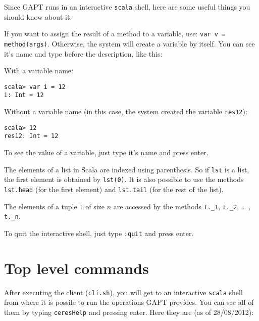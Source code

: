 \documentclass[a4paper, 11pt]{report}
\begin{document}
Since GAPT runs in an interactive \texttt{scala} shell, here are some useful things you
should know about it.

If you want to assign the result of a method to a variable, use: 
\texttt{var v = method(args)}. Otherwise, the system will create a variable by 
itself. You can see it's name and type before the description, like this:

With a variable name:

\begin{lstlisting}
scala> var i = 12
i: Int = 12
\end{lstlisting}

Without a variable name (in this case, the system created the variable \texttt{res12}):

\begin{lstlisting}
scala> 12
res12: Int = 12
\end{lstlisting}

To see the value of a variable, just type it’s name and press enter.

The elements of a list in Scala are indexed using parenthesis. So if \texttt{lst} 
is a list, the first element is obtained by \texttt{lst(0)}. It is also possible 
to use the methods \texttt{lst.head} (for the first element) and \texttt{lst.tail} 
(for the rest of the list).

The elements of a tuple \texttt{t} of size $n$ are accessed by the methods 
\texttt{t.\_1}, \texttt{t.\_2}, … , \texttt{t.\_n}.

To quit the interactive shell, just type \texttt{:quit} and press enter.

\section{Top level commands}

After executing the client (\texttt{cli.sh}), you will get to an interactive \texttt{scala} shell 
from where it is possile to run the operations GAPT provides. You can see all of
them by typing \texttt{ceresHelp} and pressing enter. Here they are (as of
28/08/2012):
\end{document}
